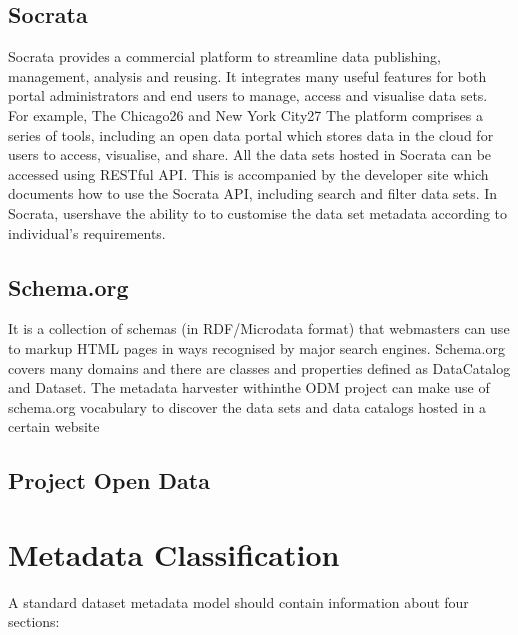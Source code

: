 \documentclass[runningheads,a4paper]{llncs}
\begin{document}
\subsection{Socrata}

Socrata provides a commercial platform to streamline data publishing, management, analysis and reusing. It integrates many useful features for both portal administrators and end users to manage, access and visualise data sets. For example, The Chicago26 and New York City27 The platform comprises a series of tools, including an open data portal which stores data in the cloud for users to access, visualise, and share. All the data sets hosted in Socrata can be accessed using RESTful API. This is accompanied by the developer site which documents how to use the Socrata API, including search and filter data sets. In Socrata, usershave the ability to to customise the data set metadata according to individual’s requirements.

\subsection{Schema.org}

It is a collection of schemas (in RDF/Microdata format) that webmasters can use to markup HTML pages in ways recognised by major search engines. Schema.org covers many domains and there are classes and properties defined as DataCatalog and Dataset. The metadata harvester withinthe ODM project can make use of schema.org vocabulary to discover the data sets and data catalogs hosted in a certain website

\subsection{Project Open Data}


\section{Metadata Classification}
\label{sec:metadata}

A standard dataset metadata model should contain information about four sections:
\end{document}
